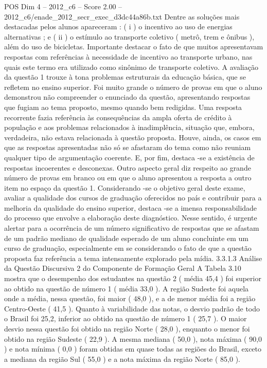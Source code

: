\begin{textsample}{POS Dim 4 – 2012\_c6 – Score 2.00 – 2012\_c6/enade\_2012\_secr\_exec\_d3dc44a86b.txt}
Dentre as soluções mais destacadas pelos alunos apareceram : ( i ) o incentivo ao uso de energias alternativas ; e ( ii ) o estímulo ao transporte coletivo ( metrô, trem e ônibus ), além do uso de bicicletas.
Importante destacar o fato de que muitos apresentavam respostas com referências à necessidade de incentivo ao transporte urbano, nas quais este termo era utilizado como sinônimo de transporte coletivo.
A avaliação da questão 1 trouxe à tona problemas estruturais da educação básica, que se refletem no ensino superior.
Foi muito grande o número de provas em que o aluno demonstrou não compreender o enunciado da questão, apresentando respostas que fugiam ao tema proposto, mesmo quando bem redigidas.
Uma resposta recorrente fazia referência às consequências da ampla oferta de crédito à população e aos problemas relacionados à inadimplência, situação que, embora, verdadeira, não estava relacionada à questão proposta.
Houve, ainda, os casos em que as respostas apresentadas não só se afastaram do tema como não reuniam qualquer tipo de argumentação coerente.
E, por fim, destaca -se a existência de respostas incoerentes e desconexas.
Outro aspecto geral diz respeito ao grande número de provas em branco ou em que o aluno apresentou a resposta a outro item no espaço da questão 1.
Considerando -se o objetivo geral deste exame, avaliar a qualidade dos cursos de graduação oferecidos no país e contribuir para a melhoria da qualidade do ensino superior, destaca -se a imensa responsabilidade do processo que envolve a elaboração deste diagnóstico.
Nesse sentido, é urgente alertar para a ocorrência de um número significativo de respostas que se afastam de um padrão mediano de qualidade esperado de um aluno concluinte em um curso de graduação, especialmente em se considerando o fato de que a questão proposta faz referência a tema intensamente explorado pela mídia. 3.3.1.3 Análise da Questão Discursiva 2 do Componente de Formação Geral A Tabela 3.10 mostra que o desempenho dos estudantes na questão 2 ( média 45,4 ) foi superior ao obtido na questão de número 1 ( média 33,0 ).
A região Sudeste foi aquela onde a média, nessa questão, foi maior ( 48,0 ), e a de menor média foi a região Centro-Oeste ( 41,5 ).
Quanto à variabilidade das notas, o desvio padrão de todo o Brasil foi 25,2, inferior ao obtido na questão de número 1 ( 25,7 ).
O maior desvio nessa questão foi obtido na região Norte ( 28,0 ), enquanto o menor foi obtido na região Sudeste ( 22,9 ).
A mesma mediana ( 50,0 ), nota máxima ( 90,0 ) e nota mínima ( 0,0 ) foram obtidas em quase todas as regiões do Brasil, exceto a mediana da região Sul ( 55,0 ) e a nota máxima da região Norte ( 85,0 ).

\end{textsample}
